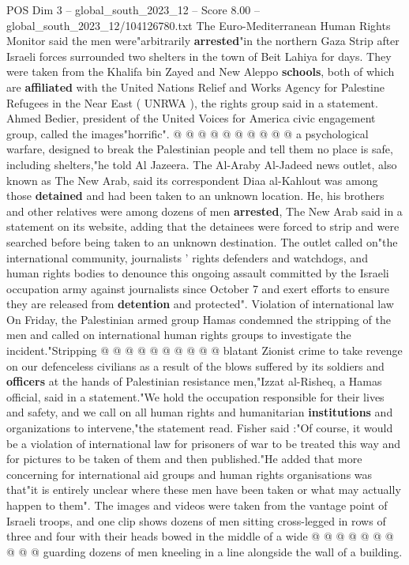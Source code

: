 \begin{textsample}{POS Dim 3 – global\_south\_2023\_12 – Score 8.00 – global\_south\_2023\_12/104126780.txt}
The Euro-Mediterranean Human Rights Monitor said the men were"arbitrarily \textbf{arrested}"in the northern Gaza Strip after Israeli forces surrounded two shelters in the town of Beit Lahiya for days.
They were taken from the Khalifa bin Zayed and New Aleppo \textbf{schools}, both of which are \textbf{affiliated} with the United Nations Relief and Works Agency for Palestine Refugees in the Near East ( UNRWA ), the rights group said in a statement.
Ahmed Bedier, president of the United Voices for America civic engagement group, called the images"horrific". @ @ @ @ @ @ @ @ @ @ a psychological warfare, designed to break the Palestinian people and tell them no place is safe, including shelters,"he told Al Jazeera.
The Al-Araby Al-Jadeed news outlet, also known as The New Arab, said its correspondent Diaa al-Kahlout was among those \textbf{detained} and had been taken to an unknown location.
He, his brothers and other relatives were among dozens of men \textbf{arrested}, The New Arab said in a statement on its website, adding that the detainees were forced to strip and were searched before being taken to an unknown destination.
The outlet called on"the international community, journalists ' rights defenders and watchdogs, and human rights bodies to denounce this ongoing assault committed by the Israeli occupation army against journalists since October 7 and exert efforts to ensure they are released from \textbf{detention} and protected".
Violation of international law On Friday, the Palestinian armed group Hamas condemned the stripping of the men and called on international human rights groups to investigate the incident."Stripping @ @ @ @ @ @ @ @ @ @ blatant Zionist crime to take revenge on our defenceless civilians as a result of the blows suffered by its soldiers and \textbf{officers} at the hands of Palestinian resistance men,"Izzat al-Risheq, a Hamas official, said in a statement."We hold the occupation responsible for their lives and safety, and we call on all human rights and humanitarian \textbf{institutions} and organizations to intervene,"the statement read.
Fisher said :"Of course, it would be a violation of international law for prisoners of war to be treated this way and for pictures to be taken of them and then published."He added that more concerning for international aid groups and human rights organisations was that"it is entirely unclear where these men have been taken or what may actually happen to them".
The images and videos were taken from the vantage point of Israeli troops, and one clip shows dozens of men sitting cross-legged in rows of three and four with their heads bowed in the middle of a wide @ @ @ @ @ @ @ @ @ @ guarding dozens of men kneeling in a line alongside the wall of a building.

\end{textsample}

